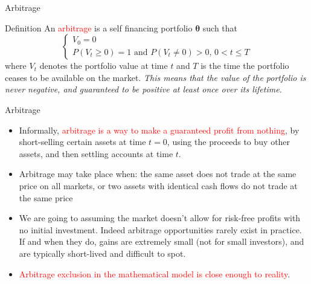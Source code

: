 \documentclass{beamer}
\begin{document}
\begin{frame}{Arbitrage}
	\begin{block}{Definition}
		An \textcolor{red}{arbitrage} is a self financing portfolio $\mathbf{\theta}$ such that
		\begin{equation}
			\begin{cases}
			V_0 = 0 \\
			P(V_{t}\geq 0)=1\text{ and }P(V_{t}\neq 0)>0,\,0<t\leq T
			\end{cases}
		\end{equation}
		where $V_t$ denotes the portfolio value at time $t$ and $T$ is the time the portfolio ceases to be available on the market. 
		\emph{This means that the value of the portfolio is never negative, and guaranteed to be positive at least once over its lifetime.}
	\end{block}
\end{frame}
\begin{frame}{Arbitrage}
	\begin{itemize}
		\item 	Informally, \textcolor{red}{arbitrage is a way to make a guaranteed profit from nothing}, by short-selling certain assets at time $t = 0$, using the proceeds to buy other assets, and then settling accounts at time $t$. 
		\item Arbitrage may take place when: the same asset does not trade at the same price on all markets, or two assets with identical cash flows do not trade at the same price
		\item We are going to assuming the market doesn't allow for risk-free profits with no initial investment.
		Indeed arbitrage opportunities rarely exist in practice. If and when they do, gains are extremely small (not for small investors), and are typically short-lived and difficult to spot. 
		\item \textcolor{red}{Arbitrage exclusion in the mathematical model is close enough to reality}.
	\end{itemize}
\end{frame}
\end{document}
